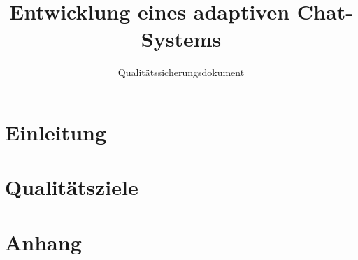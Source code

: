 \documentclass[accentcolor=tud0b,12pt,paper=a4]{tudreport}
\title{Entwicklung eines adaptiven Chat-Systems}
\subtitle{Qualitätssicherungsdokument}
\begin{document}
  \maketitle
  \tableofcontents

  \chapter{Einleitung}
  

  \chapter{Qualitätsziele}
  



\appendix


  \chapter{Anhang}
  
\end{document}
